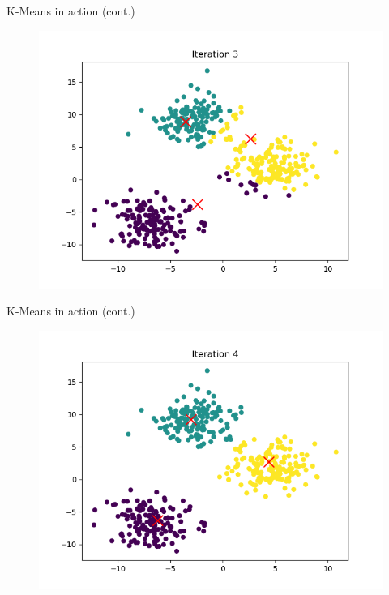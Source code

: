 \documentclass[serif, aspectratio=169]{beamer}
\begin{document}
\begin{frame}{K-Means in action (cont.)}
    \begin{figure}
        \centering
        \includegraphics[scale=0.45]{kmeans_in_action_figures/kmeans_iter_3.png}
    \end{figure}
\end{frame}
\begin{frame}{K-Means in action (cont.)}
    \begin{figure}
        \centering
        \includegraphics[scale=0.45]{kmeans_in_action_figures/kmeans_iter_4.png}
    \end{figure}
\end{frame}
\end{document}
